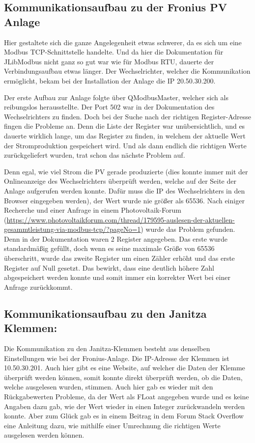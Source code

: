 \subsection{Kommunikationsaufbau zu der Fronius PV Anlage }
Hier gestaltete sich die ganze Angelegenheit etwas schwerer, da es sich um eine Modbus TCP-Schnittstelle handelte. Und da hier die Dokumentation für JLibModbus nicht ganz so gut war wie für Modbus RTU, dauerte der Verbindungsaufbau etwas länger. Der Wechselrichter, welcher die Kommunikation ermöglicht, bekam bei der Installation der Anlage die IP 20.50.30.200.


Der erste Aufbau zur Anlage folgte über QModbusMaster, welcher sich als reibungslos herausstellte. Der Port 502 war in der Dokumentation des Wechselrichters zu finden. Doch bei der Suche nach der richtigen Register-Adresse fingen die Probleme an. Denn die Liste der Register war unübersichtlich, und es dauerte wirklich lange, um das Register zu finden, in welchem der aktuelle Wert der Stromproduktion gespeichert wird. Und als dann endlich die richtigen Werte zurückgeliefert wurden, trat schon das nächste Problem auf.


Denn egal, wie viel Strom die PV gerade produzierte (dies konnte immer mit der Onlineanzeige des Wechselrichters überprüft werden, welche auf der Seite der Anlage aufgerufen werden konnte. Dafür muss die IP des Wechselrichters in den Browser eingegeben werden), der Wert wurde nie größer als 65536. Nach einiger Recherche und einer Anfrage in einem Photovoltaik-Forum (\url{https://www.photovoltaikforum.com/thread/179595-auslesen-der-aktuellen-gesammtleistung-via-modbus-tcp/?pageNo=1}) wurde das Problem gefunden. Denn in der Dokumentation waren 2 Register angegeben. Das erste wurde standardmäßig gefüllt, doch wenn es seine maximale Größe von 65536 überschritt, wurde das zweite Register um einen Zähler erhöht und das erste Register auf Null gesetzt. Das bewirkt, dass eine deutlich höhere Zahl abgespeichert werden konnte und somit immer ein korrekter Wert bei einer Anfrage zurückkommt.


\subsection{Kommunikationsaufbau zu den Janitza Klemmen: } \label{text:Janitza}


Die Kommunikation zu den Janitza-Klemmen besteht aus denselben Einstellungen wie bei der Fronius-Anlage. Die IP-Adresse der Klemmen ist 10.50.30.201. Auch hier gibt es eine Website, auf welcher die Daten der Klemme überprüft werden können, somit konnte direkt überprüft werden, ob die Daten, welche ausgelesen wurden, stimmen. Auch hier gab es wieder mit den Rückgabewerten Probleme, da der Wert als FLoat angegeben wurde und es keine Angaben dazu gab, wie der Wert wieder in einen Integer zurückwandeln werden konnte. Aber zum Glück gab es in einem Beitrag in dem Forum Stack Overflow eine Anleitung dazu, wie mithilfe einer Umrechnung die richtigen Werte ausgelesen werden können.


